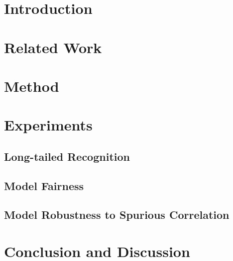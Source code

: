 \begin{abstract}
    
\end{abstract}


\section{Introduction}\label{sec:intro}

\section{Related Work}\label{sec:rw}

\section{Method}\label{sec:synaug}

\section{Experiments}


\subsection{Long-tailed Recognition}\label{sec:lt}


\subsection{Model Fairness}\label{sec:fairness}


\subsection{Model Robustness to Spurious Correlation}\label{sec:robustness}

\section{Conclusion and Discussion}\label{sec:conclusion}



{\small


}




